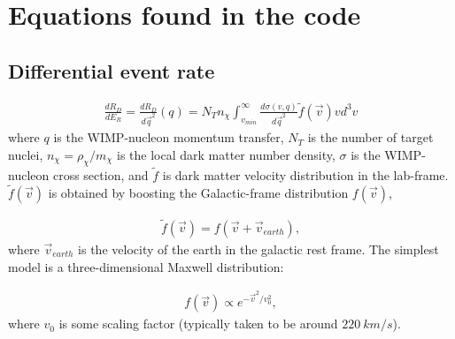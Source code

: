 \documentclass[11pt]{article}
\begin{document}
\clearpage

\section{Equations found in the code}
\subsection{Differential event rate}
\begin{equation}\label{ER}
\begin{split}
	\frac{dR_D}{dE_R} = \frac{dR_D}{d\vec{q}^2}(q)
	 = N_T n_\chi \int_{v_{min}}^\infty \frac{d\sigma(v,q)}{d\vec{q}^2} \tilde{f}(\vec{v})vd^3v
\end{split}
\end{equation}
where $q$ is the WIMP-nucleon momentum transfer, $N_T$ is the number of target 
nuclei, $n_\chi = \rho_\chi/m_\chi$ is the local dark matter number density, $\sigma$ 
is the WIMP-nucleon cross section, and $\tilde{f}$ is dark matter velocity 
distribution in the lab-frame. $\tilde{f}(\vec{v})$ is obtained by boosting 
the Galactic-frame distribution $f(\vec{v})$, 

\begin{equation}\label{boost}
\begin{split}
	\tilde{f}(\vec{v}) = f(\vec{v} + \vec{v}_{earth}),
\end{split}
\end{equation}
where $\vec{v}_{earth}$ is the velocity of the earth in the galactic rest 
frame. The simplest model is a three-dimensional Maxwell distribution:

\begin{equation}
\begin{split}
	f(\vec{v}) \propto e^{-\vec{v}^2/v_0^2},
\end{split}
\end{equation}
where $v_0$ is some scaling factor (typically taken to be around $220\ km/s$).
\end{document}

